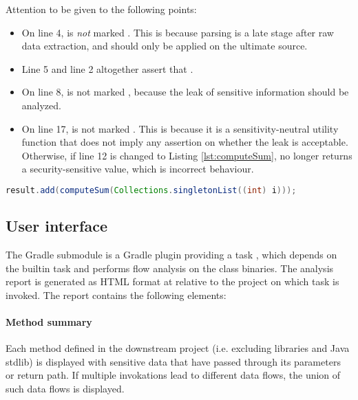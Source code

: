 Attention to be given to the following points:
\begin{itemize}
	\item On line 4,  is \emph{not} marked .
		This is because parsing is a late stage after raw data extraction,
		and  should only be applied on the ultimate source.
	\item Line 5 and line 2 altogether assert that
		.
	\item On line 8,  is not marked ,
		because the leak of sensitive information should be analyzed.
	\item On line 17,  is not marked .
		This is because it is a sensitivity-neutral utility function
		that does not imply any assertion on whether the leak is acceptable.
		Otherwise, if line 12 is changed to Listing \ref{lst:computeSum},
		 no longer returns a security-sensitive value,
		which is incorrect behaviour.
\end{itemize}

\begin{lstlisting}[style=j, language=java, label={lst:computeSum},
caption={Example of leak through computeSum}]
	result.add(computeSum(Collections.singletonList((int) i)));
\end{lstlisting}

\subsection{User interface}
The  Gradle submodule
is a Gradle plugin providing a task ,
which depends on the  builtin task
and performs flow analysis on the class binaries.
The analysis report is generated as HTML format at
relative to the project on which task is invoked.
The report contains the following elements:

\paragraph{Method summary}
Each method defined in the downstream project (i.e. excluding libraries and Java stdlib)
is displayed with sensitive data that have passed through its parameters or return path.
If multiple invokations lead to different data flows,
the union of such data flows is displayed.

